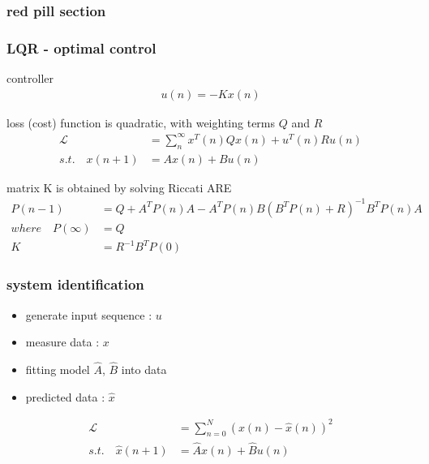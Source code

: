 \documentclass{beamer}
\begin{document}
\begin{frame}
  \frametitle{\bf red pill section}
\end{frame}



\begin{frame}
  \frametitle{\bf LQR - optimal control}

  controller
  \begin{align*}
    u(n) = -Kx(n)
  \end{align*}
  
  loss (cost) function is quadratic, with weighting terms $Q$ and $R$
  \begin{align*}
    \mathcal{L} &=\sum_n^{\infty} x^T(n) Q x(n) + u^T(n) R u(n) \\
    s.t. \quad x(n+1) &= Ax(n) + Bu(n) 
  \end{align*}  

  matrix K is obtained by solving Riccati ARE
  \begin{align*}
    P(n-1) &= Q + A^TP(n)A - A^TP(n)B(B^TP(n) + R)^{-1}B^TP(n)A \\
    where \quad P(\infty) &= Q \\
    K &= R^{-1}B^TP(0)
  \end{align*}

\end{frame}

\begin{frame}
  
  \frametitle{\bf system identification}

  \begin{itemize}
    \item generate input sequence : $u$
    \item measure data : $x$
    \item fitting model $\hat{A}$, $\hat{B}$ into data
    \item predicted data : $\hat{x}$
  \end{itemize}
  
  \begin{align*}
    \mathcal{L} &= \sum_{n=0}^{N} (x(n) - \hat{x}(n))^2 \\
    s.t. \quad \hat{x}(n+1) &= \hat{A}x(n) + \hat{B}u(n)
  \end{align*}
 
  
\end{frame}
\end{document}
